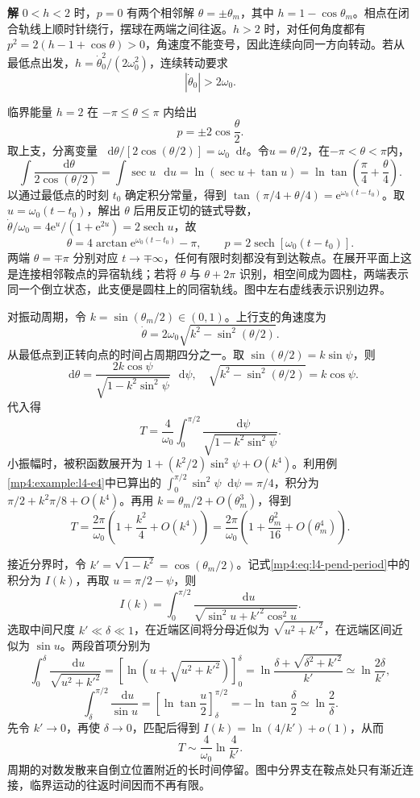\documentclass[11pt,openany,fontset=fandol]{ctexbook}
\theoremstyle{definition}\newtheorem{example}{例}[chapter]\newtheorem{exercise}{习题}[chapter]
\newcommand{\SolutionStart}{\par\medskip\ifdim\pagetotal>0pt\ifdim\dimexpr\pagegoal-\pagetotal\relax<3\baselineskip\newpage\fi\fi\noindent\textbf{解}\quad\ignorespaces}
\newenvironment{solution}{\SolutionStart}{\par\medskip}
\newcommand{\dd}{\mathop{}\!\mathrm d}\newcommand{\ee}{\mathrm e}\newcommand{\vct}[1]{\bm{#1}}
\begin{document}
\begin{solution}
$0<h<2$ 时，$p=0$ 有两个相邻解 $\theta=\pm\theta_m$，其中 $h=1-\cos\theta_m$。相点在闭合轨线上顺时针绕行，摆球在两端之间往返。$h>2$ 时，对任何角度都有 $p^2=2(h-1+\cos\theta)>0$，角速度不能变号，因此连续向同一方向转动。若从最低点出发，$h=\dot\theta_0^2/(2\omega_0^2)$，连续转动要求
\[
|\dot\theta_0|>2\omega_0.
\]

临界能量 $h=2$ 在 $-\pi\le\theta\le\pi$ 内给出
\[
p=\pm2\cos\frac\theta2.
\]
取上支，分离变量 $\dd\theta/[2\cos(\theta/2)]=\omega_0\dd t$。令$u=\theta/2$，在$-\pi<\theta<\pi$内，
\[
\int\frac{\dd\theta}{2\cos(\theta/2)}
=\int\sec u\,\dd u
=\ln(\sec u+\tan u)
=\ln\tan\left(\frac\pi4+\frac\theta4\right).
\]
以通过最低点的时刻 $t_0$ 确定积分常量，得到 $\tan(\pi/4+\theta/4)=\ee^{\omega_0(t-t_0)}$。取 $u=\omega_0(t-t_0)$，解出 $\theta$ 后用反正切的链式导数，$\dot\theta/\omega_0=4\ee^u/(1+\ee^{2u})=2\operatorname{sech}u$，故
\[
\theta=4\arctan\ee^{\omega_0(t-t_0)}-\pi,
\qquad p=2\operatorname{sech}[\omega_0(t-t_0)].
\]
两端 $\theta=\mp\pi$ 分别对应 $t\to\mp\infty$，任何有限时刻都没有到达鞍点。在展开平面上这是连接相邻鞍点的异宿轨线；若将 $\theta$ 与 $\theta+2\pi$ 识别，相空间成为圆柱，两端表示同一个倒立状态，此支便是圆柱上的同宿轨线。图中左右虚线表示识别边界。

对振动周期，令 $k=\sin(\theta_m/2)\in(0,1)$。上行支的角速度为
\[
\dot\theta=2\omega_0\sqrt{k^2-\sin^2(\theta/2)}.
\]
从最低点到正转向点的时间占周期四分之一。取 $\sin(\theta/2)=k\sin\psi$，则
\[
\dd\theta=\frac{2k\cos\psi}{\sqrt{1-k^2\sin^2\psi}}\,\dd\psi,
\quad
\sqrt{k^2-\sin^2(\theta/2)}=k\cos\psi.
\]
代入得
\begin{equation}\label{mp4:eq:l4-pend-period}
T=\frac4{\omega_0}\int_0^{\pi/2}
\frac{\dd\psi}{\sqrt{1-k^2\sin^2\psi}}.
\end{equation}
小振幅时，被积函数展开为 $1+(k^2/2)\sin^2\psi+O(k^4)$。利用例\ref{mp4:example:l4-e4}中已算出的 $\int_0^{\pi/2}\sin^2\psi\dd\psi=\pi/4$，积分为 $\pi/2+k^2\pi/8+O(k^4)$。再用 $k=\theta_m/2+O(\theta_m^3)$，得到
\[
T=\frac{2\pi}{\omega_0}
\left(1+\frac{k^2}{4}+O(k^4)\right)
=\frac{2\pi}{\omega_0}
\left(1+\frac{\theta_m^2}{16}+O(\theta_m^4)\right).
\]

接近分界时，令 $k'=\sqrt{1-k^2}=\cos(\theta_m/2)$。记式\eqref{mp4:eq:l4-pend-period}中的积分为 $I(k)$，再取 $u=\pi/2-\psi$，则
\[
I(k)=\int_0^{\pi/2}\frac{\dd u}{\sqrt{\sin^2u+k'^2\cos^2u}}.
\]
选取中间尺度 $k'\ll\delta\ll1$，在近端区间将分母近似为 $\sqrt{u^2+k'^2}$，在远端区间近似为 $\sin u$。两段首项分别为
\[
\int_0^\delta\frac{\dd u}{\sqrt{u^2+k'^2}}
=\left[\ln(u+\sqrt{u^2+k'^2})\right]_0^\delta
=\ln\frac{\delta+\sqrt{\delta^2+k'^2}}{k'}
\simeq\ln\frac{2\delta}{k'},
\]
\[
\int_\delta^{\pi/2}\frac{\dd u}{\sin u}
=\left[\ln\tan\frac u2\right]_\delta^{\pi/2}
=-\ln\tan\frac\delta2\simeq\ln\frac2\delta.
\]
先令 $k'\to0$，再使 $\delta\to0$，匹配后得到 $I(k)=\ln(4/k')+o(1)$，从而
\[
T\sim\frac4{\omega_0}\ln\frac4{k'}.
\]
周期的对数发散来自倒立位置附近的长时间停留。图中分界支在鞍点处只有渐近连接，临界运动的往返时间因而不再有限。
\end{solution}
\end{document}
